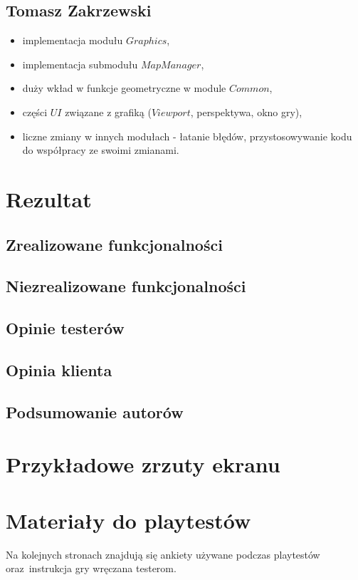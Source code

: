 \documentclass[licencjacka]{pracamgr}
\begin{document}
  \section{Tomasz Zakrzewski}
  \begin{itemize}
   \item implementacja modułu $Graphics$,
   \item implementacja submodułu $MapManager$,
   \item duży wkład w funkcje geometryczne w module $Common$,
   \item części $UI$ związane z grafiką ($Viewport$, perspektywa, okno gry),
   \item liczne zmiany w innych modułach - łatanie błędów, przystosowywanie kodu do współpracy ze swoimi zmianami.
  \end{itemize}

\chapter{Rezultat}

  \section{Zrealizowane funkcjonalności}

  \section{Niezrealizowane funkcjonalności}

  \section{Opinie testerów}

  \section{Opinia klienta}

  \section{Podsumowanie autorów}

\appendix

  \chapter{Przykładowe zrzuty ekranu}

  \chapter{Materiały do playtestów}
  Na kolejnych stronach znajdują się ankiety używane podczas playtestów
  oraz~instrukcja gry wręczana testerom.
\end{document}

